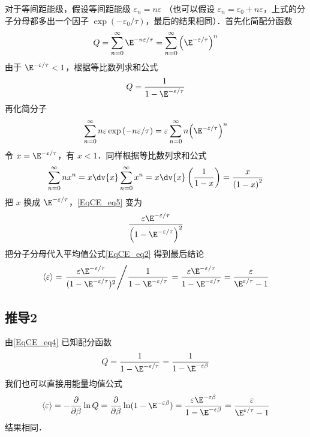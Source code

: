 对于等间距能级，假设等间距能级 ${\varepsilon _n} = n\varepsilon$ （也可以假设 ${\varepsilon _n} = {\varepsilon _0} + n\varepsilon $，上式的分子分母都多出一个因子 $\exp ( - {\varepsilon _0}/\tau )$，最后的结果相同）．首先化简配分函数
\begin{equation}
Q = \sum\limits_{n = 0}^\infty  {{\E^{ - n\varepsilon /\tau }}}  = \sum\limits_{n = 0}^\infty  {{{\left( {{\E^{ - \varepsilon /\tau }}} \right)}^n}} 
\end{equation}
由于 ${\E^{ - \varepsilon /\tau }} < 1$，根据等比数列求和公式 %
\begin{equation}\label{EqCE_eq4}
Q = \frac{1}{{1 - {\E^{ - \varepsilon /\tau }}}}
\end{equation}
再化简分子
\begin{equation}\label{EqCE_eq5}
\sum\limits_{n = 0}^\infty  {n\varepsilon \exp \left( { - n\varepsilon /\tau } \right)}  = \varepsilon \sum\limits_{n = 0}^\infty  {n{{\left( {{\E^{ - \varepsilon /\tau }}} \right)}^n}}
\end{equation}
令 $x = {\E^{ - \varepsilon /\tau }}$，有 $x < 1$．同样根据等比数列求和公式
\begin{equation}
\sum\limits_{n = 0}^\infty  {n{x^n}}  = x\dv{x}\sum\limits_{n = 0}^\infty  {{x^n}}  = x\dv{x}\left( {\frac{1}{{1 - x}}} \right) = \frac{x}{{{{\left( {1 - x} \right)}^2}}}
\end{equation}
把 $x$ 换成 ${\E^{ - \varepsilon /\tau }}$，\autoref{EqCE_eq5} 变为
\begin{equation}
\frac{{\varepsilon {\E^{ - \varepsilon /\tau }}}}{{{{\left( {1 - {\E^{ - \varepsilon /\tau }}} \right)}^2}}}
\end{equation}
把分子分母代入平均值公式\autoref{EqCE_eq2} 得到最后结论
\begin{equation}
\langle \varepsilon \rangle = \left. \frac{\varepsilon \E^{-\varepsilon/\tau}}{(1 - \E^{-\varepsilon /\tau})^2} \middle/ \frac{1}{1 - \E^{-\varepsilon/\tau}}  \right. = \frac{\varepsilon \E^{-\varepsilon/\tau}}{1 - \E^{-\varepsilon/\tau}} = \frac{\varepsilon}{\E^{\varepsilon/\tau} - 1}
\end{equation}

\subsection{推导2}
由\autoref{EqCE_eq4} 已知配分函数
\begin{equation}
Q = \frac{1}{{1 - {\E^{ - \varepsilon /\tau }}}} = \frac{1}{{1 - {\E^{ - \varepsilon\beta }}}}
\end{equation}
我们也可以直接用能量均值公式
\begin{equation}
\langle\varepsilon\rangle = -\frac{\partial}{\partial\beta}\ln Q
= \frac{\partial }{{\partial \beta }}\ln (1 - {\E^{ - \varepsilon \beta }}) = \frac{{\varepsilon {\E^{ - \varepsilon \beta }}}}{{1 - {\E^{ - \varepsilon \beta }}}} = \frac{\varepsilon }{{{\E^{\varepsilon /\tau }} - 1}}
\end{equation}
结果相同．
